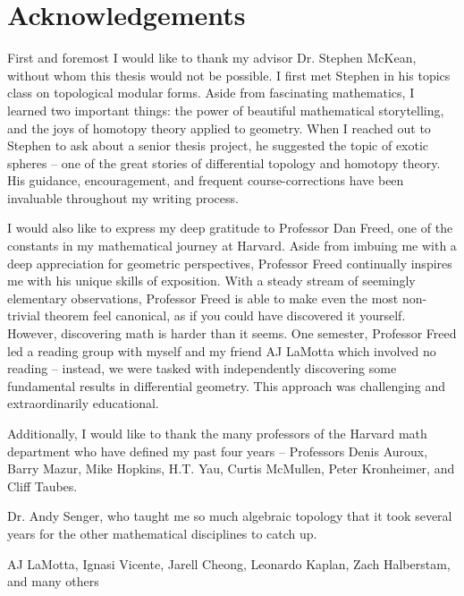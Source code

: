 \chapter*{Acknowledgements}

First and foremost I would like to thank my advisor Dr. Stephen McKean, without whom this thesis would not be possible. I first met Stephen in his topics class on topological modular forms. Aside from fascinating mathematics, I learned two important things: the power of beautiful mathematical storytelling, and the joys of homotopy theory applied to geometry. 
When I reached out to Stephen to ask about a senior thesis project, he suggested the topic of exotic spheres -- one of the great stories of differential topology and homotopy theory. His guidance, encouragement, and frequent course-corrections have been invaluable throughout my writing process.

I would also like to express my deep gratitude to Professor Dan Freed, one of the constants in my mathematical journey at Harvard.
Aside from imbuing me with a deep appreciation for geometric perspectives, Professor Freed continually inspires me with his unique skills of exposition. With a steady stream of seemingly elementary observations, Professor Freed is able to make even the most non-trivial theorem feel canonical, as if you could have discovered it yourself. However, discovering math is harder than it seems.
One semester, Professor Freed led a reading group with myself and my friend AJ LaMotta which involved no reading -- instead, we were tasked with independently discovering some fundamental results in differential geometry. This approach was challenging and extraordinarily educational.



Additionally, I would like to thank the many professors of the Harvard math department who have defined my past four years -- 
Professors Denis Auroux, Barry Mazur, Mike Hopkins, H.T. Yau, Curtis McMullen, Peter Kronheimer, and Cliff Taubes. 

Dr. Andy Senger, who taught me so much algebraic topology that it took several years for the other mathematical disciplines to catch up.

AJ LaMotta, Ignasi Vicente, Jarell Cheong, Leonardo Kaplan, Zach Halberstam, and many others


